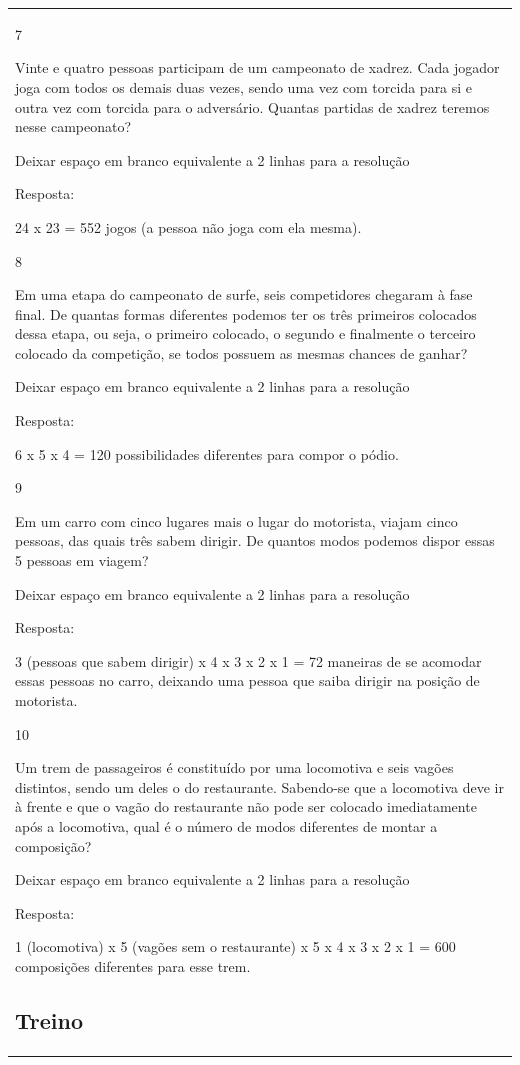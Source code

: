 \begin{mdframed}[linewidth=2pt,linecolor=salmao,roundcorner=2pt]
\begin{escolha}
{{{\begin{longtable}[]{@{}l@{}}
\begin{itemize}
{\num{7}

Vinte e quatro pessoas participam de um campeonato de xadrez. Cada jogador joga com todos os demais duas vezes, sendo uma vez com
torcida para si e outra vez com torcida para o adversário. Quantas partidas
de xadrez teremos nesse campeonato?

Deixar espaço em branco equivalente a 2 linhas para a resolução

Resposta:

24 x 23 = 552 jogos (a pessoa não joga com ela mesma).

\num{8}

Em uma etapa do campeonato de surfe, seis competidores chegaram à fase
final. De quantas formas diferentes podemos ter os três primeiros
colocados dessa etapa, ou seja, o primeiro colocado, o segundo e
finalmente o terceiro colocado da competição, se todos
possuem as mesmas chances de ganhar?

Deixar espaço em branco equivalente a 2 linhas para a resolução

Resposta:

6 x 5 x 4 = 120 possibilidades diferentes para compor o pódio.

\num{9}

Em um carro com cinco lugares mais o lugar do motorista, viajam cinco pessoas,
das quais três sabem dirigir. De quantos modos podemos dispor essas 5
pessoas em viagem?

Deixar espaço em branco equivalente a 2 linhas para a resolução

Resposta:

3 (pessoas que sabem dirigir) x 4 x 3 x 2 x 1 = 72 maneiras de se
acomodar essas pessoas no carro, deixando uma pessoa que saiba dirigir
na posição de motorista.

\num{10}

Um trem de passageiros é constituído por uma locomotiva e seis vagões
distintos, sendo um deles o do restaurante. Sabendo-se que a locomotiva deve ir
à frente e que o vagão do restaurante não pode ser colocado imediatamente
após a locomotiva, qual é o número de modos diferentes de montar a
composição?

Deixar espaço em branco equivalente a 2 linhas para a resolução

Resposta:

1 (locomotiva) x 5 (vagões sem o restaurante) x 5 x 4 x 3 x 2 x 1 = 600
composições diferentes para esse trem.

\subsection{Treino}

}
\end{itemize}
\end{longtable}}}}
\end{escolha}
\end{mdframed}
